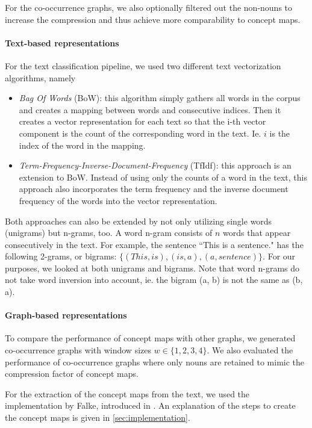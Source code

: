 For the co-occurrence graphs, we also optionally filtered out the non-nouns to increase the compression and thus achieve more comparability to concept maps.

\paragraph{Text-based representations}
For the text classification pipeline, we used two different text vectorization algorithms, namely
\begin{itemize}
\item{\textit{Bag Of Words} (BoW): this algorithm simply gathers all words in the corpus and creates a mapping between words and consecutive indices. Then it creates a vector representation for each text so that the i-th vector component is the count of the corresponding word in the text. Ie. $i$ is the index of the word in the mapping.}
\item{\textit{Term-Frequency-Inverse-Document-Frequency} (TfIdf): this approach is an extension to BoW. Instead of using only the counts of a word in the text, this approach also incorporates the term frequency and the inverse document frequency of the words into the vector representation.}
\end{itemize}
Both approaches can also be extended by not only utilizing single words (unigrams) but n-grams, too. A word n-gram consists of $n$ words that appear consecutively in the text.
For example, the sentence ``This is a sentence." has the following 2-grams, or bigrams: $\{ (This, is), (is, a), (a, sentence) \}$.
For our purposes, we looked at both unigrams and bigrams.
Note that word n-grams do not take word inversion into account, ie. the bigram (a, b) is not the same as (b, a).

\paragraph{Graph-based representations}
To compare the performance of concept maps with other graphs, we generated co-occurrence graphs with window sizes $w \in \{1, 2, 3, 4\}$.
We also evaluated the performance of co-occurrence graphs where only nouns are retained to mimic the compression factor of concept maps.

For the extraction of the concept maps from the text, we used the implementation by Falke, introduced in \cite{Falke2017}.
An explanation of the steps to create the concept maps is given in \ref{sec:implementation}.

